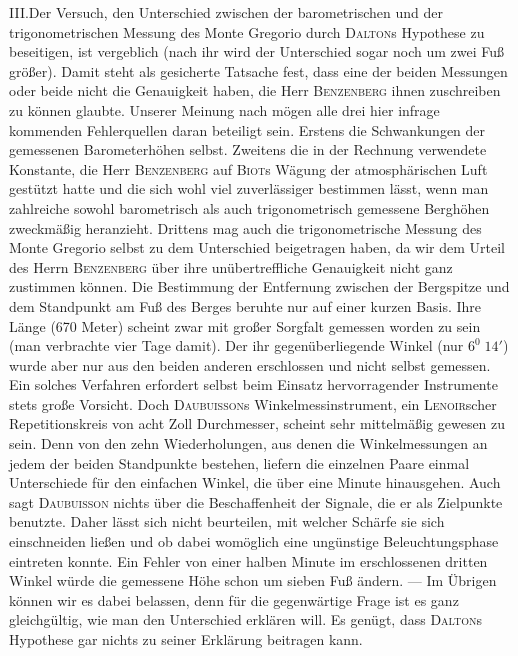 III.\quad Der Versuch, den Unterschied zwischen der barometrischen und der trigonometrischen Messung des Monte Gregorio durch \textsc{Dalton}s Hypothese zu beseitigen, ist vergeblich (nach ihr wird der Unterschied sogar noch um zwei Fuß größer). Damit steht als gesicherte Tatsache fest, dass eine der beiden Messungen oder beide nicht die Genauigkeit haben, die Herr \textsc{Benzenberg} ihnen zuschreiben zu können glaubte. Unserer Meinung nach mögen alle drei hier infrage kommenden Fehlerquellen daran beteiligt sein. Erstens die Schwankungen der gemessenen Barometerhöhen selbst. Zweitens die in der Rechnung verwendete Konstante, die Herr \textsc{Benzenberg} auf \textsc{Biot}s Wägung der atmosphärischen Luft gestützt hatte und die sich wohl viel zuverlässiger bestimmen lässt, wenn man zahlreiche sowohl barometrisch als auch trigonometrisch gemessene Berghöhen zweckmäßig heranzieht. Drittens mag auch die trigonometrische Messung des Monte Gregorio selbst zu dem Unterschied beigetragen haben, da wir dem Urteil des Herrn \textsc{Benzenberg} über ihre unübertreffliche Genauigkeit nicht ganz zustimmen können. Die Bestimmung der Entfernung zwischen der Bergspitze und dem Standpunkt am Fuß des Berges beruhte nur auf einer kurzen Basis. Ihre Länge (670 Meter) scheint zwar mit großer Sorgfalt gemessen worden zu sein (man verbrachte vier Tage damit). Der ihr gegenüberliegende Winkel (nur $6^0\;14'$) wurde aber nur aus den beiden anderen erschlossen und nicht selbst gemessen. Ein solches Verfahren erfordert selbst beim Einsatz hervorragender Instrumente stets große Vorsicht. Doch \textsc{Daubuisson}s Winkelmessinstrument, ein \textsc{Lenoir}scher Repetitionskreis von acht Zoll Durchmesser, scheint sehr mittelmäßig gewesen zu sein. Denn von den zehn Wiederholungen, aus denen die Winkelmessungen an jedem der beiden Standpunkte bestehen, liefern die einzelnen Paare einmal Unterschiede für den einfachen Winkel, die über eine Minute hinausgehen. Auch sagt \textsc{Daubuisson} nichts über die Beschaffenheit der Signale, die er als Zielpunkte benutzte. Daher lässt sich nicht beurteilen, mit welcher Schärfe sie sich einschneiden ließen und ob dabei womöglich eine ungünstige Beleuchtungsphase eintreten konnte. Ein Fehler von einer halben Minute im erschlossenen dritten Winkel würde die gemessene Höhe schon um sieben Fuß ändern. — Im Übrigen können wir es dabei belassen, denn für die gegenwärtige Frage ist es ganz gleichgültig, wie man den Unterschied erklären will. Es genügt, dass \textsc{Dalton}s Hypothese gar nichts zu seiner Erklärung beitragen kann.

